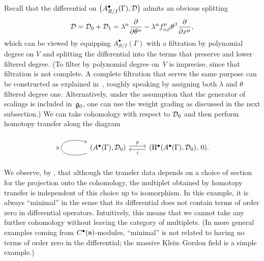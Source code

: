 \documentclass[pdftex]{sigma}
\numberwithin{equation}{section}
\def\bu{\bullet}
\begin{document}
Recall that the differential on $\big(A^\bullet_{R/I} (\Gamma),\mathcal D\big)$ admits an obvious splitting
\begin{equation*}
\mathcal D = \mathcal D_0 + \mathcal D_1 = \lambda^\alpha \frac{\partial}{\partial \theta^\alpha} - \lambda^\alpha f^\mu_{\alpha \beta} \theta^\beta \frac{\partial}{\partial x^\mu} ,
\end{equation*}
which can be viewed by equipping $A^\bullet_{R/I}(\Gamma)$ with a filtration by polynomial degree on $V$ and splitting the differential into the terms that preserve and lower filtered degree.
(To filter by polynomial degree on~$V$ is imprecise, since that filtration is not complete. A complete filtration that serves the same purpose can be constructed as explained in~\cite{perspectives}, roughly speaking by assigning both $\lambda$ and $\theta$ filtered degree one. Alternatively, under the assumption that the generator of scalings is included in~$\mathfrak g_0$, one can use the weight grading as discussed in the next subsection.)
We can take cohomology with respect to $\mathcal D_0$ and then perform homotopy transfer along the diagram
\begin{equation*}
\begin{tikzcd}
\arrow[loop left]{l}{h}(A^\bullet (\Gamma) , \cD_0)\arrow[r, shift left, "p"] &(\mathrm H^\bullet(A^\bullet(\Gamma), \cD_0) , \, 0)\arrow[l, shift left, "i"] .
\end{tikzcd}
\end{equation*}
We observe, by \cite[Theorem 10.3.15]{LodayVallette}, that although the transfer data depends on a choice of section for the projection onto the cohomology, the multiplet obtained by homotopy transfer is independent of this choice up to isomorphism. In this example, it is always ``minimal'' in the sense that its differential does not contain terms of order zero in differential operators.
Intuitively, this means that we cannot take any further cohomology without leaving the category of multiplets. (In more general examples coming from $C^\bu(\fn)$-modules, ``minimal'' is not related to having no terms of order zero in the differential; the massive Klein--Gordon field is a simple example.)
\end{document}
